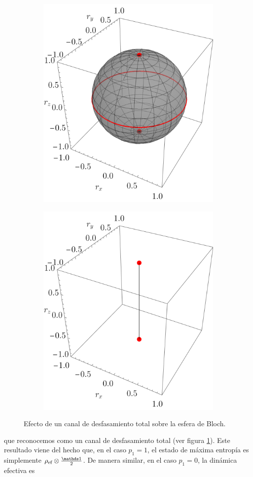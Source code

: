\begin{figure}[ht!]
  \centering
  \begin{subfigure}{0.5\textwidth}
    \centering
    \includegraphics[width=0.6\linewidth]{chapter3/figures_toy/CNOT_p=0.5_t=0._r=0.9.png}
  \end{subfigure}%
  \begin{subfigure}{0.5\textwidth}
    \centering
    \includegraphics[width=0.6\linewidth]{chapter3/figures_toy/CNOT_p=1._t=1_r=0.9.png}
  \end{subfigure}
  \caption{Efecto de un canal de desfasamiento total sobre la esfera de Bloch. \label{fig:PhaseFlip}}
\end{figure}
que reconocemos como un canal de desfasamiento total (ver figura \ref{fig:PhaseFlip}). Este resultado viene del hecho que, en el caso $p_{1}=1$, el estado de máxima entropía es simplemente $\rho_{\ef}\otimes\frac{\Id}{2}$. De manera similar, en el caso $p_{1}=0$, la dinámica efectiva es
